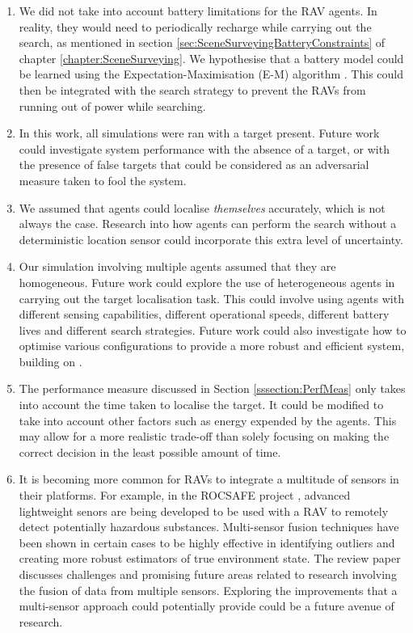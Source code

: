 \begin{enumerate}

    \item We did not take into account battery limitations for the RAV agents. In reality, they would need to periodically recharge while carrying out the search, as mentioned in section \ref{sec:SceneSurveyingBatteryConstraints} of chapter \ref{chapter:SceneSurveying}. We hypothesise that a battery model could be learned using the Expectation-Maximisation (E-M) algorithm \cite{Dempster1977MaximumAlgorithm}. This could then be integrated with the search strategy to prevent the RAVs from running out of power while searching.
    \item In this work, all simulations were ran with a target present. Future work could investigate system performance with the absence of a target, or with the presence of false targets that could be considered as an adversarial measure taken to fool the system.
    \item We assumed that agents could localise \textit{themselves} accurately, which is not always the case. Research into how agents can perform the search without a deterministic location sensor could incorporate this extra level of uncertainty.
    \item Our simulation involving multiple agents assumed that they are homogeneous. Future work could explore the use of heterogeneous agents in carrying out the target localisation task. This could involve using agents with different sensing capabilities, different operational speeds, different battery lives and different search strategies. Future work could also investigate how to optimise various configurations to provide a more robust and efficient system, building on \cite{Chung2008Multi-agentFramework}.
    \item The performance measure discussed in Section \ref{sssection:PerfMeas} only takes into account the time taken to localise the target. It could be modified to take into account other factors such as energy expended by the agents. This may allow for a more realistic trade-off than solely focusing on making the correct decision in the least possible amount of time.
    \item It is becoming more common for RAVs to integrate a multitude of sensors in their platforms. For example, in the ROCSAFE project \cite{Bagherzadeh2017ROCSAFE:Incidents}, advanced lightweight senors are being developed to be used with a RAV to remotely detect potentially hazardous substances. Multi-sensor fusion techniques have been shown in certain cases to be highly effective in identifying outliers and creating more robust estimators of true environment state. The review paper \cite{Khaleghi2013MultisensorState-of-the-art} discusses challenges and promising future areas related to research involving the fusion of data from multiple sensors. Exploring the improvements that a multi-sensor approach could potentially provide could be a future avenue of research.

\end{enumerate}
